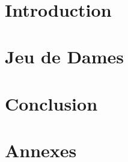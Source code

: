 \documentclass[oneside,openright,titlepage,numbers=noenddot,headinclude,footinclude=true,cleardoublepage=empty,listof=totoc,paper=a4,fontsize=12pt,french,DIV=calc]{scrreprt}
\begin{document}
\frenchspacing
\raggedbottom
{}
\clearpairofpagestyles
\rofoot[\pagemark]{\pagemark}

\pagestyle{plain}

\onehalfspacing


\newpage \ \newpage %

\pagestyle{scrheadings}
\onehalfspacing
{}

\listoffigures

\chapter{Introduction}\label{c:Introduction}


\chapter{Jeu de Dames}\label{c:Developpement}


\chapter{Conclusion}\label{c:Conclusion}




\chapter*{Annexes}

\end{document}
